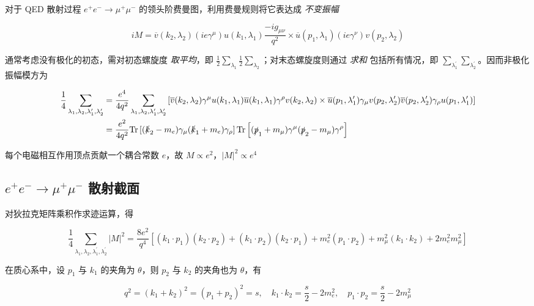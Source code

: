 \documentclass[oneside,a4paper,openany,11pt]{ctexbook}
\begin{document}
对于 QED 散射过程 $e^+ e^- \to \mu^+ \mu^-$ 的领头阶费曼图，利用费曼规则将它表达成 \emph{不变振幅}

\begin{equation}
    iM = \overline{v}(k_2, \lambda_2) (ie\gamma^\mu) u(k_1, \lambda_1) \frac{-i g_{\mu\nu}}{q^2} \times \overline{u}(p_1, \lambda_1) (ie\gamma^\nu) v(p_2, \lambda_2)
\end{equation}

通常考虑没有极化的初态，需对初态螺旋度 \emph{取平均}，即 $\frac{1}{2}\sum_{\lambda_1}\frac{1}{2}\sum_{\lambda_2}$；对末态螺旋度则通过 \emph{求和} 包括所有情况，即 $\sum_{\lambda_1^\prime} \sum_{\lambda_2^\prime}$。因而非极化振幅模方为

\begin{align}
    \frac{1}{4} \sum_{\lambda_1, \lambda_2, \lambda_1^\prime, \lambda_2^\prime} &= \frac{e^4}{4 q^2} \sum_{\lambda_1, \lambda_2, \lambda_1^\prime, \lambda_2^\prime} \left[\overline{v}(k_2, \lambda_2) \gamma^\mu u(k_1, \lambda_1) \overline{u}(k_1, \lambda_1) \gamma^\rho v(k_2, \lambda_2) \times \overline{u}(p_1, \lambda_1^\prime) \gamma_\mu v(p_2, \lambda_2^\prime) \overline{v}(p_2, \lambda_2^\prime) \gamma_\rho u(p_1, \lambda_1^\prime)\right] \\
    &= \frac{e^2}{4 q^2} \mathrm{Tr}\left[(\slashed{k}_2-m_e)\gamma_\mu(\slashed{k}_1+m_e)\gamma_\rho\right] \mathrm{Tr}\left[(\slashed{p}_1+m_\mu)\gamma^\mu(\slashed{p}_2-m_\mu)\gamma^\rho\right]
\end{align}

每个电磁相互作用顶点贡献一个耦合常数 $e$，故 $M \propto e^2$，$|M|^2 \propto e^4$

\subsection{\texorpdfstring{$e^+ e^- \to \mu^+ \mu^-$}{e+e- -> mu+mu-} 散射截面}

对狄拉克矩阵乘积作求迹运算，得

\begin{equation}
    \frac{1}{4} \sum_{\lambda_1, \lambda_2, \lambda_1^\prime, \lambda_2^\prime} |M|^2 = \frac{8 e^2}{q^4} \left[(k_1 \cdot p_1)(k_2 \cdot p_2) + (k_1 \cdot p_2)(k_2 \cdot p_1) + m_e^2 (p_1 \cdot p_2) + m_\mu^2 (k_1 \cdot k_2) + 2 m_e^2 m_\mu^2\right]
\end{equation}

在质心系中，设 $p_1$ 与 $k_1$ 的夹角为 $\theta$，则 $p_2$ 与 $k_2$ 的夹角也为 $\theta$，有

\begin{equation}
    q^2 = (k_1 + k_2)^2 = (p_1 + p_2)^2 = s, \quad k_1 \cdot k_2 = \frac{s}{2} - 2 m_e^2, \quad p_1 \cdot p_2 = \frac{s}{2} - 2 m_\mu^2
\end{equation}
\end{document}
